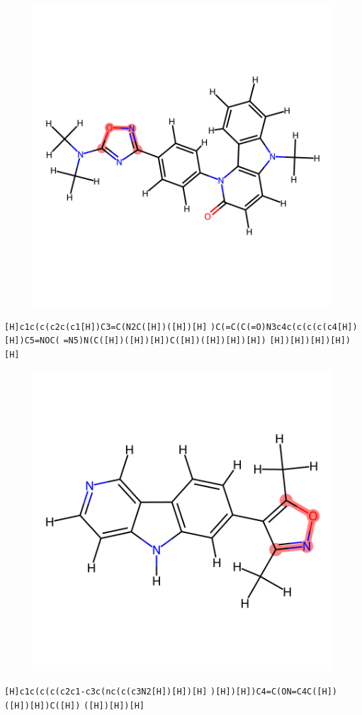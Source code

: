 \documentclass{article}
\begin{document}
\begin{figure}[ht]
\centering
    \includegraphics{mol44.png}
\end{figure}
\verb|[H]c1c(c(c2c(c1[H])C3=C(N2C([H])([H])[H]| \verb|)C(=C(C(=O)N3c4c(c(c(c(c4[H])[H])C5=NOC(| \verb|=N5)N(C([H])([H])[H])C([H])([H])[H])[H])| \verb|[H])[H])[H])[H])[H]|

\begin{figure}[ht]
\centering
    \includegraphics{mol45.png}
\end{figure}
\verb|[H]c1c(c(c(c2c1-c3c(nc(c(c3N2[H])[H])[H]| \verb|)[H])[H])C4=C(ON=C4C([H])([H])[H])C([H])| \verb|([H])[H])[H]|
\end{document}
